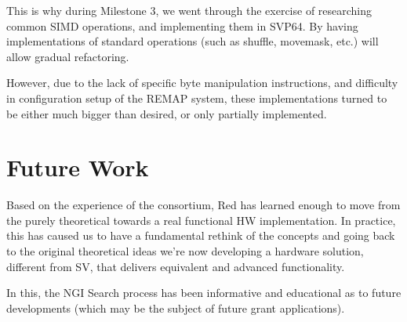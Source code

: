 This is why during Milestone 3, we went through the exercise of researching
common SIMD operations, and implementing them in SVP64. By having
implementations of standard operations (such as shuffle, movemask, etc.) will
allow gradual refactoring.

However, due to the lack of specific byte manipulation instructions, and
difficulty in configuration setup of the REMAP system, these implementations
turned to be either much bigger than desired, or only partially implemented.

\section{Future Work}

Based on the experience of the consortium, Red has learned enough to move from
the purely theoretical towards a real functional HW implementation.
In practice, this has caused us to have a fundamental rethink of the concepts
and going back to the original theoretical ideas we're now developing a hardware
solution, different from \acrshort{SV}, that delivers equivalent and
advanced functionality.

In this, the \acrshort{NGI} Search process has been informative and educational
as to future developments (which may be the subject of future grant applications).
